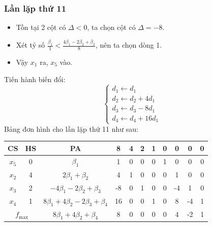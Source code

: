 \documentclass[12pt]{article}
\begin{document}
\subsubsection{Lần lặp thứ 11}
\begin{itemize}
\item Tồn tại 2 cột có $\Delta < 0$, ta chọn cột có $\Delta = -8$.
\item Xét tỷ số $\displaystyle \frac{\beta_1}{1} < \frac{4\beta_1 - 2\beta_2 + \beta_3}{8}$, nên ta chọn dòng 1.
\item Vậy $x_1$ ra, $x_5$ vào.
\end{itemize}
Tiến hành biến đổi:
$$
\left\{
\begin{array}{lll}
d_1 \leftarrow d_1 \\
d_2 \leftarrow d_2 + 4d_1\\
d_3 \leftarrow d_3 - 8d_1\\
d_4 \leftarrow d_4 + 16d_1
\end{array}
\right.
$$
Bảng đơn hình cho lần lặp thứ 11 như sau:
\begin{table}[H]
\centering
\begin{tabular}{|c|c|c|c|c|c|c|c|c|c|c|}
\hline
CS & HS & PA & 8 & 4 & 2 & 1 & 0 & 0 & 0 & 0 \\
\hline
$x_5$ & 0 & $\beta_1$ & 1 & 0 & 0 & 0 & 1 & 0 & 0 & 0 \\
$x_2$ & 4 & $2\beta_1 + \beta_2$ & 4 & 1 & 0 & 0 & 0 & 1 & 0 & 0 \\
$x_3$ & 2 & $-4\beta_1 - 2\beta_2 + \beta_3$ & -8 & 0 & 1 & 0 & 0 & -4 & 1 & 0 \\
$x_4$ & 1 & $8\beta_1 + 4\beta_2 - 2\beta_3 + \beta_4$ & 16 & 0 & 0 & 1 & 0 & 8 & -4 & 1 \\
\hline
\multicolumn{2}{|c|}{$f_{\max}$}
& $8\beta_1 + 4\beta_2 + \beta_4$ & 8 & 0 & 0 & 0 & 0 & 4 & -2 & 1 \\
\hline
\end{tabular}
\end{table}
\end{document}
